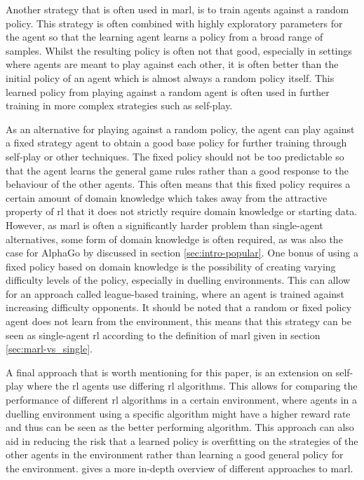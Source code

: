 Another strategy that is often used in \gls{marl}, is to train agents against a random policy.
This strategy is often combined with highly exploratory parameters for the agent so that the learning agent learns a policy from a broad range of samples.
Whilst the resulting policy is often not that good, especially in settings where agents are meant to play against each other, it is often better than the initial policy of an agent which is almost always a random policy itself.
This learned policy from playing against a random agent is often used in further training in more complex strategies such as self-play.


As an alternative for playing against a random policy, the agent can play against a fixed strategy agent to obtain a good base policy for further training through self-play or other techniques.
The fixed policy should not be too predictable so that the agent learns the general game rules rather than a good response to the behaviour of the other agents.
This often means that this fixed policy requires a certain amount of domain knowledge which takes away from the attractive property of \gls{rl} that it does not strictly require domain knowledge or starting data.
However, as \gls{marl} is often a significantly harder problem than single-agent alternatives, some form of domain knowledge is often required, as was also the case for AlphaGo by \citet{alphago} discussed in section \ref{sec:intro-popular}.
One bonus of using a fixed policy based on domain knowledge is the possibility of creating varying difficulty levels of the policy, especially in duelling environments.
This can allow for an approach called league-based training, where an agent is trained against increasing difficulty opponents. 
It should be noted that a random or fixed policy agent does not learn from the environment, this means that this strategy can be seen as single-agent \gls{rl} according to the definition of \gls{marl} given in section \ref{sec:marl-vs_single}.


A final approach that is worth mentioning for this paper, is an extension on self-play where the \gls{rl} agents use differing \gls{rl} algorithms.
This allows for comparing the performance of different \gls{rl} algorithms in a certain environment, where agents in a duelling environment using a specific algorithm might have a higher reward rate and thus can be seen as the better performing algorithm.
This approach can also aid in reducing the risk that a learned policy is overfitting on the strategies of the other agents in the environment rather than learning a good general policy for the environment. 
 gives a more in-depth overview of different approaches to \gls{marl}.


